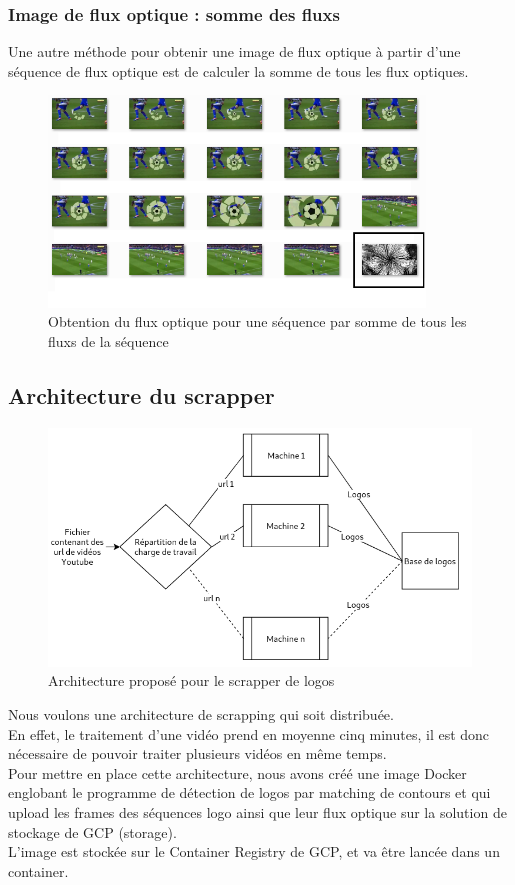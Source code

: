 \documentclass[11pt]{article}
\begin{document}
\subsubsection{Image de flux optique : somme des fluxs}
\label{sec:org12ac54b}
Une autre méthode pour obtenir une image de flux optique à partir d'une séquence de flux optique est de calculer la somme de tous les flux optiques.\\
\begin{figure}[htbp]
\centering
\includegraphics[width=10cm]{optical_flow_sum.png}
\caption{Obtention du flux optique pour une séquence par somme de tous les fluxs de la séquence}
\end{figure}



\subsection{Architecture du scrapper}
\label{sec:org2eb2e12}
\begin{figure}[htbp]
\centering
\includegraphics[width=15cm]{arch_scrap.png}
\caption{Architecture proposé pour le scrapper de logos}
\end{figure}
Nous voulons une architecture de scrapping qui soit distribuée.\\
En effet, le traitement d'une vidéo prend en moyenne cinq minutes, il est donc nécessaire de pouvoir traiter plusieurs vidéos en même temps.\\
Pour mettre en place cette architecture, nous avons créé une image Docker englobant le programme de détection de logos par matching de contours et qui upload les frames des séquences logo ainsi que leur flux optique sur la solution de stockage de GCP (storage).\\
L'image est stockée sur le Container Registry de GCP, et va être lancée dans un container.\\
\end{document}
